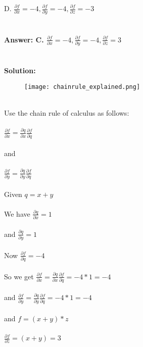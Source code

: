 \documentclass[prl,twocolumn,showpacs,preprintnumbers,superscriptaddress]{revtex4}
\theoremstyle{plain}
\theoremstyle{definition}
\begin{document}
\begin{widetext}
D. $\frac{\partial f}{\partial x} = -4, \frac{\partial f}{\partial y} = -4, \frac{\partial f}{\partial z} = -3$
\\
\\
\\
\textbf{Answer: C. $\frac{\partial f}{\partial x} = -4, \frac{\partial f}{\partial y} = -4, \frac{\partial f}{\partial z} = 3$}
\\
\\
\\
\textbf{Solution:} 
\begin{figure}[H]
\begin{center}
    \texttt{[image: chainrule\_explained.png]}
\end{center}
\end{figure}
\\
Use the chain rule of calculus as follows:\\ \\
$\frac{\partial f}{\partial x} = \frac{\partial q}{\partial x}\frac{\partial f}{\partial q}$
\\
\\
and
\\
\\
$\frac{\partial f}{\partial y} = \frac{\partial q}{\partial y}\frac{\partial f}{\partial q}$
\\
\\
Given $q = x + y$
\\
\\
We have $\frac{\partial q}{\partial x} = 1$
\\
\\
and $\frac{\partial q}{\partial y} = 1$
\\
\\
Now $\frac{\partial f}{\partial q} = -4$
\\
\\
So we get $\frac{\partial f}{\partial x} = \frac{\partial q}{\partial x}\frac{\partial f}{\partial q} = -4 * 1 = -4$
\\
\\
and
$\frac{\partial f}{\partial y} = \frac{\partial q}{\partial y}\frac{\partial f}{\partial q} = -4 * 1 = -4$
\\
\\
and
$f = (x + y) * z$
\\
\\
$\frac{\partial f}{\partial z} = (x + y) = 3$
\\
\\
\\

\end{widetext}
\end{document}
